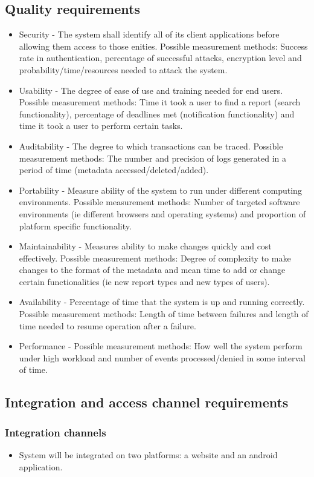 \documentclass[11pt]{article}
\begin{document}
	\subsection{Quality requirements}
		\begin{itemize}
			\item Security - The system shall identify all of its client applications before allowing them access to those enities. Possible measurement methods: Success rate in authentication, percentage of successful attacks, encryption level and probability/time/resources needed to attack the system.
			\item Usability - The degree of ease of use and training needed for end users. Possible measurement methods: Time it took a user to find a report (search functionality), percentage of deadlines met (notification functionality) and time it took a user to perform certain tasks.
			\item Auditability - The degree to which transactions can be traced. Possible measurement methods: The number and precision of logs generated in a period of time (metadata accessed/deleted/added).
			\item Portability - Measure ability of the system to run under different computing environments. Possible measurement methods: Number of targeted software environments (ie different browsers and operating systems) and proportion of platform specific functionality.
			\item Maintainability - Measures ability to make changes quickly and cost effectively. Possible measurement methods: Degree of complexity to make changes to the format of the metadata and mean time to add or change certain functionalities (ie new report types and new types of users).
			\item Availability - Percentage of time that the system is up and running correctly. Possible measurement methods: Length of time between failures and length of time needed to resume operation after a failure.
			\item Performance - Possible measurement methods: How well the system perform under high workload and number of events processed/denied in some interval of time.
		\end{itemize}
	
	\subsection{Integration and access channel requirements}
		\subsubsection{Integration channels}
			\begin{itemize}
				\item System will be integrated on two platforms: a website and an android application.
			\end{itemize}
\end{document}
